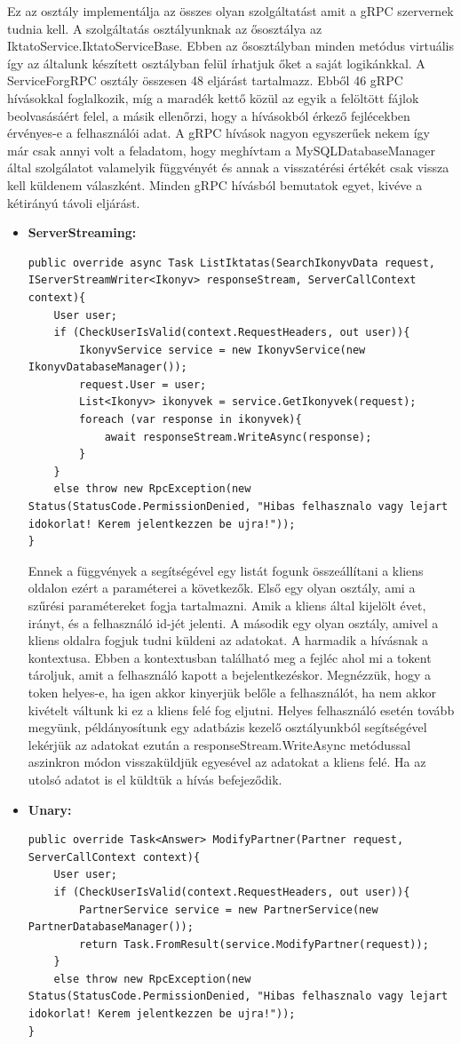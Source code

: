 \documentclass[
]{thesis-ekf}
\theoremstyle{definition}
\theoremstyle{remark}
\begin{document}
Ez az osztály implementálja az összes olyan szolgáltatást amit a gRPC szervernek tudnia kell. A szolgáltatás osztályunknak az ősosztálya az IktatoService.IktatoServiceBase. Ebben az ősosztályban minden metódus virtuális így az általunk készített osztályban felül írhatjuk őket a saját logikánkkal. A ServiceForgRPC osztály összesen 48 eljárást tartalmazz. Ebből 46 gRPC hívásokkal foglalkozik, míg a maradék kettő közül az egyik a felöltött fájlok beolvasásáért felel, a másik ellenőrzi, hogy a hívásokból érkező fejlécekben érvényes-e a felhasználói adat. A gRPC hívások nagyon egyszerűek nekem így már csak annyi volt a feladatom, hogy meghívtam a MySQLDatabaseManager által szolgálatot valamelyik függvényét és annak a visszatérési értékét csak vissza kell küldenem válaszként. Minden gRPC hívásból bemutatok egyet, kivéve a kétirányú távoli eljárást.
\begin{itemize}[leftmargin=0pt]
	\item \textbf{ServerStreaming: }
	\begin{lstlisting}
public override async Task ListIktatas(SearchIkonyvData request, IServerStreamWriter<Ikonyv> responseStream, ServerCallContext context){
	User user;
	if (CheckUserIsValid(context.RequestHeaders, out user)){
		IkonyvService service = new IkonyvService(new IkonyvDatabaseManager());
		request.User = user;
		List<Ikonyv> ikonyvek = service.GetIkonyvek(request);
		foreach (var response in ikonyvek){
			await responseStream.WriteAsync(response);
		}
	}
	else throw new RpcException(new Status(StatusCode.PermissionDenied, "Hibas felhasznalo vagy lejart idokorlat! Kerem jelentkezzen be ujra!"));
} 

	\end{lstlisting}
	Ennek a függvények a segítségével egy listát fogunk összeállítani a kliens oldalon ezért a paraméterei a következők. Első egy olyan osztály, ami a szűrési paramétereket fogja tartalmazni. Amik a kliens által kijelölt évet, irányt, és a felhasználó id-jét jelenti. A második egy olyan osztály, amivel a kliens oldalra fogjuk tudni küldeni az adatokat. A harmadik a hívásnak a kontextusa. Ebben a kontextusban található meg a fejléc ahol mi a tokent tároljuk, amit a felhasználó kapott a bejelentkezéskor. Megnézzük, hogy a token helyes-e, ha igen akkor kinyerjük belőle a felhasználót, ha nem akkor kivételt váltunk ki ez a kliens felé fog eljutni.  Helyes felhasználó esetén tovább megyünk, példányosítunk egy adatbázis kezelő osztályunkból segítségével lekérjük az adatokat ezután a responseStream.WriteAsync metódussal aszinkron módon visszaküldjük egyesével az adatokat a kliens felé. Ha az utolsó adatot is el küldtük a hívás befejeződik.
	\item \textbf{Unary: }
		\begin{lstlisting}
public override Task<Answer> ModifyPartner(Partner request, ServerCallContext context){
	User user;
	if (CheckUserIsValid(context.RequestHeaders, out user)){
		PartnerService service = new PartnerService(new PartnerDatabaseManager());
		return Task.FromResult(service.ModifyPartner(request));
	}
	else throw new RpcException(new Status(StatusCode.PermissionDenied, "Hibas felhasznalo vagy lejart idokorlat! Kerem jelentkezzen be ujra!"));
}


\end{lstlisting}
\end{itemize}
\end{document}
